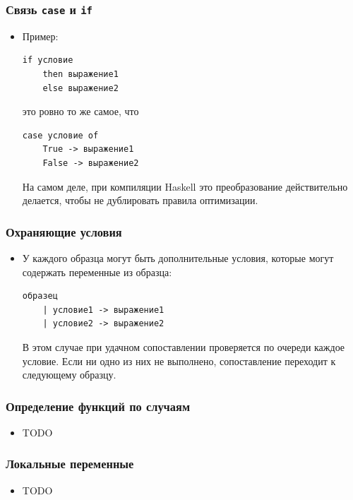 \documentclass[12pt]{beamer}
\begin{document}
\begin{frame}[fragile]
\frametitle{Связь \lstinline[basicstyle=\ttfamily]|case| и \lstinline[basicstyle=\ttfamily]|if|}
\begin{itemize}
    \item Пример:
\begin{lstlisting}
if условие 
    then выражение1 
    else выражение2
\end{lstlisting}
это ровно то же самое, что
\begin{lstlisting}
case условие of
    True -> выражение1 
    False -> выражение2
\end{lstlisting}
    На самом деле, при компиляции Haskell это преобразование действительно делается, чтобы не дублировать правила оптимизации.
\end{itemize}
\end{frame}


\begin{frame}[fragile]
\frametitle{Охраняющие условия}
\begin{itemize}
    \item У каждого образца могут быть дополнительные условия, которые могут содержать переменные из образца: 
\begin{lstlisting}
образец
    | условие1 -> выражение1 
    | условие2 -> выражение2
\end{lstlisting}
В этом случае при удачном сопоставлении проверяется по очереди каждое условие. Если ни одно из них не выполнено, сопоставление переходит к следующему образцу.
\end{itemize}
\end{frame}

\begin{frame}[fragile]
\frametitle{Определение функций по случаям}
\begin{itemize}
    \item TODO
\end{itemize}
\end{frame}

\begin{frame}[fragile]
\frametitle{Локальные переменные}
\begin{itemize}
    \item TODO
\end{itemize}
\end{frame}
\end{document}
